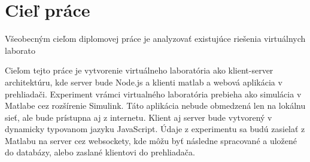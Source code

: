 \section{Cieľ práce}
Všeobecným cieľom diplomovej práce je analyzovať existujúce riešenia virtuálnych laborato

Cieľom tejto práce je vytvorenie virtuálneho laboratória ako klient-server architektúru, kde server bude Node.js a klienti matlab a webová aplikácia v prehliadači. Experiment vrámci virtualného laboratória prebieha ako simulácia v Matlabe cez rozšírenie Simulink. Táto aplikácia nebude obmedzená len na lokálnu sieť, ale bude prístupna aj z internetu. Klient aj server bude vytvorený v dynamicky typovanom jazyku JavaScript. Údaje z experimentu sa budú zasielať z Matlabu na server cez websockety, kde môžu byť následne spracované a uložené do databázy, alebo zaslané klientovi do prehliadača.


